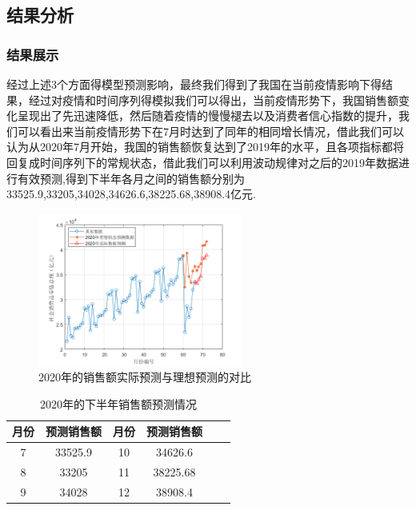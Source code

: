 \documentclass{whutmod}
\begin{document}
	\subsection{结果分析}
	\subsubsection{结果展示}
	经过上述3个方面得模型预测影响，最终我们得到了我国在当前疫情影响下得结果，经过对疫情和时间序列得模拟我们可以得出，当前疫情形势下，我国销售额变化呈现出了先迅速降低，然后随着疫情的慢慢褪去以及消费者信心指数的提升，我们可以看出来当前疫情形势下在7月时达到了同年的相同增长情况，借此我们可以认为从2020年7月开始，我国的销售额恢复达到了2019年的水平，且各项指标都将回复成时间序列下的常规状态，借此我们可以利用波动规律对之后的2019年数据进行有效预测,得到下半年各月之间的销售额分别为33525.9,33205,34028,34626.6,38225.68,38908.4亿元.
	\begin{figure}[!htbp]
		\centering
		\includegraphics[width=0.6\textwidth]{pred4.png}
		\caption{2020年的销售额实际预测与理想预测的对比}
	\end{figure}
	
	\begin{table}[!htbp]
		\caption{2020年的下半年销售额预测情况} \centering
		\begin{tabular}{cccccc}
			\toprule[1.5pt]
			月份 & 预测销售额  &月份 & 预测销售额\\
			\midrule[1pt]
			7&33525.9&	10&34626.6\\
			8&33205&	11&38225.68\\
			9&34028&	12&	38908.4\\
			\bottomrule[1.5pt]
		\end{tabular}
	\end{table}
						
\end{document}
